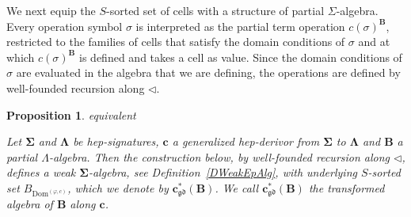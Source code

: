\documentclass[a4paper, reqno]{amsbook}
\makeatletter
\newcommand{\sig}[1]{\mathbf{#1}}             %
\newcommand{\Dom}{\mathrm{Dom}}
\newcommand{\gd}{\mathfrak{gd}}              %
\theoremstyle{plain}
\newtheorem{proposition}[theorem]{Proposition}
\theoremstyle{definition}
\newcommand*{\CA@leanpending}{}
\newcommand*{\CA@leanrelation}{}
\newcommand*{\lean}[2]{%
  \ifcsname\string\color@lean@#1\endcsname\else
    \PackageError{main}{Unknown relation `#1' in \string\lean}{Use equivalent, weaker or stronger.}%
  \fi
  \gdef\CA@leanrelation{#1}%
  \gdef\CA@leanpending{#2}}
\makeatother
\begin{document}
We next equip the $S$-sorted set of cells with a structure of partial $\Sigma$-algebra.
Every operation symbol $\sigma$ is interpreted as the partial term operation $c(\sigma)^{\mathbf{B}}$, restricted to the families of cells that satisfy the domain conditions of $\sigma$ and at which $c(\sigma)^{\mathbf{B}}$ is defined and takes a cell as value.
Since the domain conditions of $\sigma$ are evaluated in the algebra that we are defining, the operations are defined by well-founded recursion along $\lhd$.

\begin{proposition}\label{PTransformedAlg}\lean{equivalent}{GeneralizedHepDerivor.transformed,GeneralizedHepDerivor.mem_transformed_op}
Let $\sig{\Sigma}$ and $\sig{\Lambda}$ be hep-signatures, $\mathbf{c}$ a generalized hep-derivor from $\sig{\Sigma}$ to $\sig{\Lambda}$ and $\mathbf{B}$ a partial $\Lambda$-algebra.
Then the construction below, by well-founded recursion along $\lhd$, defines a weak $\sig{\Sigma}$-algebra, see Definition~\ref{DWeakEpAlg}, with underlying $S$-sorted set $B_{\Dom^{(\varphi,c)}}$, which we denote by $\mathbf{c}^{\ast}_{\gd}(\mathbf{B})$.
We call $\mathbf{c}^{\ast}_{\gd}(\mathbf{B})$ the \emph{transformed algebra} of $\mathbf{B}$ along $\mathbf{c}$.
\end{proposition}
\end{document}
